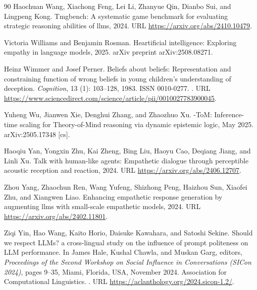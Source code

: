 \begin{thebibliography}{90}
Haochuan Wang, Xiachong Feng, Lei Li, Zhanyue Qin, Dianbo Sui, and Lingpeng Kong.
\newblock Tmgbench: A systematic game benchmark for evaluating strategic reasoning abilities of llms, 2024.
\newblock URL \url{https://arxiv.org/abs/2410.10479}.

Victoria Williams and Benjamin Rosman.
\newblock Heartificial intelligence: Exploring empathy in language models, 2025.
\newblock arXiv preprint arXiv:2508.08271.

Heinz Wimmer and Josef Perner.
\newblock Beliefs about beliefs: Representation and constraining function of wrong beliefs in young children's understanding of deception.
\newblock \emph{Cognition}, 13 (1): 103--128, 1983.
\newblock ISSN 0010-0277.
\newblock {}.
\newblock URL \url{https://www.sciencedirect.com/science/article/pii/0010027783900045}.

Yuheng Wu, Jianwen Xie, Denghui Zhang, and Zhaozhuo Xu.
-{ToM}: Inference-time scaling for {Theory}-of-{Mind} reasoning via dynamic epistemic logic, May 2025.
\newblock arXiv:2505.17348 [cs].

Haoqiu Yan, Yongxin Zhu, Kai Zheng, Bing Liu, Haoyu Cao, Deqiang Jiang, and Linli Xu.
\newblock Talk with human-like agents: Empathetic dialogue through perceptible acoustic reception and reaction, 2024.
\newblock URL \url{https://arxiv.org/abs/2406.12707}.

Zhou Yang, Zhaochun Ren, Wang Yufeng, Shizhong Peng, Haizhou Sun, Xiaofei Zhu, and Xiangwen Liao.
\newblock Enhancing empathetic response generation by augmenting llms with small-scale empathetic models, 2024.
\newblock URL \url{https://arxiv.org/abs/2402.11801}.

Ziqi Yin, Hao Wang, Kaito Horio, Daisuke Kawahara, and Satoshi Sekine.
\newblock Should we respect {LLM}s? a cross-lingual study on the influence of prompt politeness on {LLM} performance.
\newblock In James Hale, Kushal Chawla, and Muskan Garg, editors, \emph{Proceedings of the Second Workshop on Social Influence in Conversations (SICon 2024)}, pages 9--35, Miami, Florida, USA, November 2024. Association for Computational Linguistics.
\newblock {}.
\newblock URL \url{https://aclanthology.org/2024.sicon-1.2/}.


\end{thebibliography}
